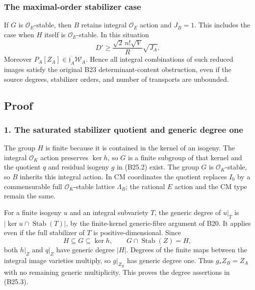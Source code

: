 \documentclass[11pt,a4paper]{article}
\theoremstyle{definition}
\begin{document}
\subsubsection{The maximal-order stabilizer case}\label{the-maximal-order-stabilizer-case}

If \(G\) is \(\mathcal O_E\)-stable, then \(B\) retains integral \(\mathcal O_E\) action and \(J_B=1\). This includes the case when \(H\) itself is \(\mathcal O_E\)-stable. In this situation \[
 D'\ge\frac{\sqrt2\,n!\sqrt V}{R}\sqrt{J_A}.
\tag{B25.8}
\] Moreover \(P_A[Z_A]\in\overline{\mathfrak j_A}\mathscr W_A\). Hence all integral combinations of such reduced images satisfy the original B23 determinant-content obstruction, even if the source degrees, stabilizer orders, and number of transports are unbounded.

\subsection{Proof}\label{quotient_escape_proofs-proof}

\subsubsection{1. The saturated stabilizer quotient and generic degree one}\label{the-saturated-stabilizer-quotient-and-generic-degree-one}

The group \(H\) is finite because it is contained in the kernel of an isogeny. The integral \(\mathcal O_K\) action preserves \(\ker h\), so \(G\) is a finite subgroup of that kernel and the quotient \(q\) and residual isogeny \(g\) in (B25.2) exist. The group \(G\) is \(\mathcal O_K\)-stable, so \(B\) inherits this integral action. In CM coordinates the quotient replaces \(I_0\) by a commensurable full \(\mathcal O_K\)-stable lattice \(\Lambda_B\); the rational \(E\) action and the CM type remain the same.

For a finite isogeny \(u\) and an integral subvariety \(T\), the generic degree of \(u|_T\) is \(|\ker u\cap\operatorname{Stab}(T)|\), by the finite-kernel generic-fibre argument of B20. It applies even if the full stabilizer of \(T\) is positive-dimensional. Since \[
 H\subseteq G\subseteq\ker h,
 \qquad G\cap\operatorname{Stab}(Z)=H,
\] both \(h|_Z\) and \(q|_Z\) have generic degree \(|H|\). Degrees of the finite maps between the integral image varieties multiply, so \(g|_{Z_B}\) has generic degree one. Thus \(g_*Z_B=Z_A\) with no remaining generic multiplicity. This proves the degree assertions in (B25.3).
\end{document}
